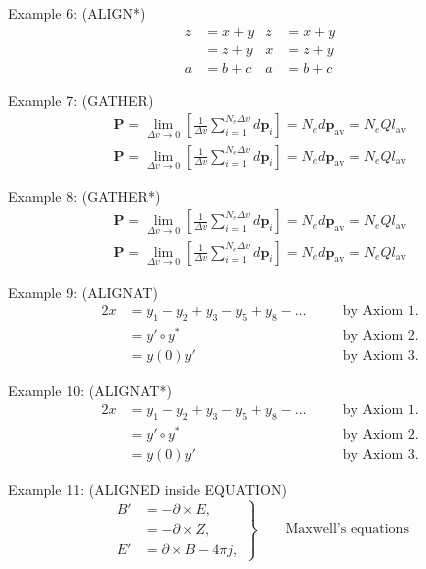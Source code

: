 \documentclass{book}
\begin{document}
\noindent Example 6: (ALIGN*)
\begin{align*}
	z & = x+y & z & = x+y \\
	  & = z+y & x & = z+y \\
	a & = b+c & a & = b+c
\end{align*}

\noindent Example 7: (GATHER)
\begin{gather}
	\mathbf{P} = \lim_{\Delta v\to 0} \left[\frac{1}{\Delta v}\sum_{i=1}^{N_{e}\Delta v}d\mathbf{p}_{i}\right] = N_{e}d\mathbf{p}_{\mathrm{av}} = N_{e}Q{l}_{\mathrm{av}} \nonumber \\
	\mathbf{P} = \lim_{\Delta v\to 0} \left[\frac{1}{\Delta v}\sum_{i=1}^{N_{e}\Delta v}d\mathbf{p}_{i}\right] = N_{e}d\mathbf{p}_{\mathrm{av}} = N_{e}Q{l}_{\mathrm{av}}
\end{gather}

\noindent Example 8: (GATHER*)
\begin{gather*}
	\mathbf{P} = \lim_{\Delta v\to 0} \left[\frac{1}{\Delta v}\sum_{i=1}^{N_{e}\Delta v}d\mathbf{p}_{i}\right] = N_{e}d\mathbf{p}_{\mathrm{av}} = N_{e}Q{l}_{\mathrm{av}} \nonumber \\
	\mathbf{P} = \lim_{\Delta v\to 0} \left[\frac{1}{\Delta v}\sum_{i=1}^{N_{e}\Delta v}d\mathbf{p}_{i}\right] = N_{e}d\mathbf{p}_{\mathrm{av}} = N_{e}Q{l}_{\mathrm{av}}
\end{gather*}

\noindent Example 9: (ALIGNAT)
\begin{alignat}{2}
	x & = y_1 - y_2 + y_3 - y_5 + y_8 - \dots & \quad & \text{by Axiom 1.} \nonumber \\
	  & = y' \circ y^{*}                      & \quad & \text{by Axiom 2.} \nonumber \\
	  & = y(0) y'                             & \quad & \text{by Axiom 3.}
\end{alignat}

\noindent Example 10: (ALIGNAT*)
\begin{alignat*}{2}
	x & = y_1 - y_2 + y_3 - y_5 + y_8 - \dots & \quad & \text{by Axiom 1.} \\
	  & = y' \circ y^{*}                      &       & \text{by Axiom 2.} \\
	  & = y(0) y'                             &       & \text{by Axiom 3.}
\end{alignat*}

\noindent Example 11: (ALIGNED inside EQUATION)
\begin{equation}
	\left.\begin{aligned}
		B' & = -\partial\times E,         \\
		   & = -\partial\times Z,         \\
		E' & = \partial\times B - 4\pi j,
	\end{aligned}\right\} \qquad \text{Maxwell's equations}
\end{equation}
\end{document}
